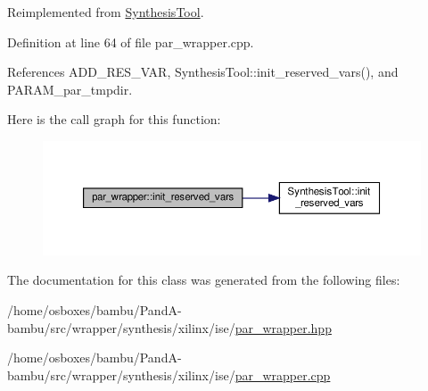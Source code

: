 Reimplemented from \hyperlink{classSynthesisTool_a85b4a4fa0cc60e5325a79d7479c505b7}{Synthesis\+Tool}.



Definition at line 64 of file par\+\_\+wrapper.\+cpp.



References A\+D\+D\+\_\+\+R\+E\+S\+\_\+\+V\+AR, Synthesis\+Tool\+::init\+\_\+reserved\+\_\+vars(), and P\+A\+R\+A\+M\+\_\+par\+\_\+tmpdir.

Here is the call graph for this function\+:
\nopagebreak
\begin{figure}[H]
\begin{center}
\leavevmode
\includegraphics[width=350pt]{d1/d07/classpar__wrapper_a25c7424ba2105125054cad920450bc6e_cgraph}
\end{center}
\end{figure}


The documentation for this class was generated from the following files\+:\begin{DoxyCompactItemize}
\item 
/home/osboxes/bambu/\+Pand\+A-\/bambu/src/wrapper/synthesis/xilinx/ise/\hyperlink{par__wrapper_8hpp}{par\+\_\+wrapper.\+hpp}\item 
/home/osboxes/bambu/\+Pand\+A-\/bambu/src/wrapper/synthesis/xilinx/ise/\hyperlink{par__wrapper_8cpp}{par\+\_\+wrapper.\+cpp}\end{DoxyCompactItemize}
